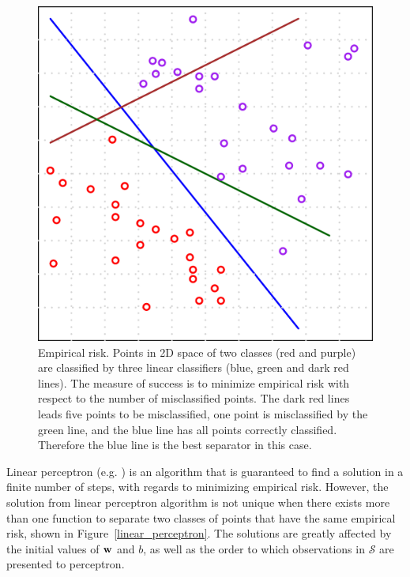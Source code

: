 \documentclass[english]{tktltiki}
\newcommand{\Scal}{\mathcal{S}}
\newcommand{\wb}{{\bf w}}
\begin{document}
\begin{figure}[t]
\begin{center}
\centering
\includegraphics[width=0.60\columnwidth]{./plots/empirical_risk.pdf}
\caption[Empirical risk minimization.]{Empirical risk. Points in 2D space of two classes (red and purple) are classified by three linear classifiers (blue, green and dark red lines). The measure of success is to minimize empirical risk with respect to the number of misclassified points. The dark red lines leads five points to be misclassified, one point is misclassified by the green line, and the blue line has all points correctly classified. Therefore the blue line is the best separator in this case.}
\label{empirical_risk}
\end{center}
\end{figure}

Linear perceptron (e.g. \cite{freund99}) is an algorithm that is guaranteed to find a solution in a finite number of steps, with regards to minimizing empirical risk. However, the solution from linear perceptron algorithm is not unique when there exists more than one function to separate two classes of points that have the same empirical risk, shown in Figure~\ref{linear_perceptron}. The solutions are greatly affected by the initial values of $\wb$ and $b$, as well as the order to which observations in $\Scal$ are presented to perceptron. 
\end{document}
